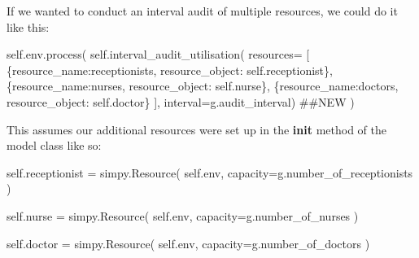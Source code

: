\documentclass[
  letterpaper,
  DIV=11,
  numbers=noendperiod]{scrreprt}
\newenvironment{Shaded}{\begin{snugshade}}{\end{snugshade}}
\newcommand{\CommentTok}[1]{\textcolor[rgb]{0.37,0.37,0.37}{#1}}
\newcommand{\NormalTok}[1]{\textcolor[rgb]{0.00,0.23,0.31}{#1}}
\newcommand{\OperatorTok}[1]{\textcolor[rgb]{0.37,0.37,0.37}{#1}}
\newcommand{\StringTok}[1]{\textcolor[rgb]{0.13,0.47,0.30}{#1}}
\newcommand{\VariableTok}[1]{\textcolor[rgb]{0.07,0.07,0.07}{#1}}
\begin{document}
\begin{tcolorbox}[enhanced jigsaw, rightrule=.15mm, colback=white, colframe=quarto-callout-tip-color-frame, colbacktitle=quarto-callout-tip-color!10!white, toprule=.15mm, coltitle=black, opacityback=0, titlerule=0mm, bottomtitle=1mm, breakable, title=\textcolor{quarto-callout-tip-color}{\faLightbulb}\hspace{0.5em}{Tip}, opacitybacktitle=0.6, toptitle=1mm, arc=.35mm, bottomrule=.15mm, leftrule=.75mm, left=2mm]

If we wanted to conduct an interval audit of multiple resources, we
could do it like this:

\begin{Shaded}
\begin{Highlighting}[]
\VariableTok{self}\NormalTok{.env.process(}
    \VariableTok{self}\NormalTok{.interval\_audit\_utilisation(}
\NormalTok{      resources}\OperatorTok{=}\NormalTok{ [}
\NormalTok{        \{}\StringTok{\textquotesingle{}resource\_name\textquotesingle{}}\NormalTok{:}\StringTok{\textquotesingle{}receptionists\textquotesingle{}}\NormalTok{, }\StringTok{\textquotesingle{}resource\_object\textquotesingle{}}\NormalTok{: }\VariableTok{self}\NormalTok{.receptionist\},}
\NormalTok{        \{}\StringTok{\textquotesingle{}resource\_name\textquotesingle{}}\NormalTok{:}\StringTok{\textquotesingle{}nurses\textquotesingle{}}\NormalTok{, }\StringTok{\textquotesingle{}resource\_object\textquotesingle{}}\NormalTok{: }\VariableTok{self}\NormalTok{.nurse\},}
\NormalTok{        \{}\StringTok{\textquotesingle{}resource\_name\textquotesingle{}}\NormalTok{:}\StringTok{\textquotesingle{}doctors\textquotesingle{}}\NormalTok{, }\StringTok{\textquotesingle{}resource\_object\textquotesingle{}}\NormalTok{: }\VariableTok{self}\NormalTok{.doctor\}}
\NormalTok{        ],}
\NormalTok{      interval}\OperatorTok{=}\NormalTok{g.audit\_interval) }\CommentTok{\#\#NEW}
\NormalTok{  )}
\end{Highlighting}
\end{Shaded}

This assumes our additional resources were set up in the \textbf{init}
method of the model class like so:

\begin{Shaded}
\begin{Highlighting}[]
  \VariableTok{self}\NormalTok{.receptionist }\OperatorTok{=}\NormalTok{ simpy.Resource(}
      \VariableTok{self}\NormalTok{.env, capacity}\OperatorTok{=}\NormalTok{g.number\_of\_receptionists}
\NormalTok{  )}

  \VariableTok{self}\NormalTok{.nurse }\OperatorTok{=}\NormalTok{ simpy.Resource(}
    \VariableTok{self}\NormalTok{.env, capacity}\OperatorTok{=}\NormalTok{g.number\_of\_nurses}
\NormalTok{    )}

  \VariableTok{self}\NormalTok{.doctor }\OperatorTok{=}\NormalTok{ simpy.Resource(}
      \VariableTok{self}\NormalTok{.env, capacity}\OperatorTok{=}\NormalTok{g.number\_of\_doctors}
\NormalTok{  )}
\end{Highlighting}
\end{Shaded}

\end{tcolorbox}
\end{document}
